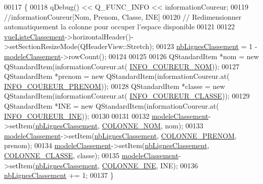 \begin{DoxyCode}
00117 \{
00118     qDebug() << Q\_FUNC\_INFO << informationCoureur;
00119     \textcolor{comment}{//informationCoureur[Nom, Prenom, Classe, INE]}
00120     \textcolor{comment}{// Redimensionner automatiquement la colonne pour occuper l'espace disponible}
00121 
00122     \hyperlink{class_i_h_m_resultats_cross_a8f35fc63f8c3a1351658d3148daf13e0}{vueListeClassement}->horizontalHeader()->setSectionResizeMode(QHeaderView::Stretch);
00123     \hyperlink{class_i_h_m_resultats_cross_a696f826387c8fa8b9925ca468a52482e}{nbLignesClassement} = 1 - \hyperlink{class_i_h_m_resultats_cross_a9d4e02948f64b6d9fef422d7f5a2b9b5}{modeleClassement}->rowCount();
00124 
00125 
00126     QStandardItem *nom = \textcolor{keyword}{new} QStandardItem(informationCoureur.at(
      \hyperlink{ihmchronocross_8h_a71b99ea06ae916bcd158edbd441c8c24}{INFO\_COUREUR\_NOM}));
00127     QStandardItem *prenom = \textcolor{keyword}{new} QStandardItem(informationCoureur.at(
      \hyperlink{ihmchronocross_8h_a68fd2611ad0ef66da1a71726675067e7}{INFO\_COUREUR\_PRENOM}));
00128     QStandardItem *classe = \textcolor{keyword}{new} QStandardItem(informationCoureur.at(
      \hyperlink{ihmchronocross_8h_a104dfa4cfc656a690caaec36fd4d3e2d}{INFO\_COUREUR\_CLASSE}));
00129     QStandardItem *INE = \textcolor{keyword}{new} QStandardItem(informationCoureur.at(
      \hyperlink{ihmgestioncross_8h_a2e5435ad2b0c61674b2dad6c0ea46301}{INFO\_COUREUR\_INE}));
00130 
00131 
00132     \hyperlink{class_i_h_m_resultats_cross_a9d4e02948f64b6d9fef422d7f5a2b9b5}{modeleClassement}->setItem(\hyperlink{class_i_h_m_resultats_cross_a696f826387c8fa8b9925ca468a52482e}{nbLignesClassement}, 
      \hyperlink{ihmchronocross_8h_aeee76385895c145ef5a633e6c6812603}{COLONNE\_NOM}, nom);
00133     \hyperlink{class_i_h_m_resultats_cross_a9d4e02948f64b6d9fef422d7f5a2b9b5}{modeleClassement}->setItem(\hyperlink{class_i_h_m_resultats_cross_a696f826387c8fa8b9925ca468a52482e}{nbLignesClassement}, 
      \hyperlink{ihmchronocross_8h_a5d6f240d26209cd66db8aa5e1aac62f9}{COLONNE\_PRENOM}, prenom);
00134     \hyperlink{class_i_h_m_resultats_cross_a9d4e02948f64b6d9fef422d7f5a2b9b5}{modeleClassement}->setItem(\hyperlink{class_i_h_m_resultats_cross_a696f826387c8fa8b9925ca468a52482e}{nbLignesClassement}, 
      \hyperlink{ihmchronocross_8h_a114680edc01528f77bb689b0a2ca18a2}{COLONNE\_CLASSE}, classe);
00135     \hyperlink{class_i_h_m_resultats_cross_a9d4e02948f64b6d9fef422d7f5a2b9b5}{modeleClassement}->setItem(\hyperlink{class_i_h_m_resultats_cross_a696f826387c8fa8b9925ca468a52482e}{nbLignesClassement}, 
      \hyperlink{ihmgestioncross_8h_aa8208c9f9fd2ea2418e4b7bb28175f80}{COLONNE\_INE}, INE);
00136     \hyperlink{class_i_h_m_resultats_cross_a696f826387c8fa8b9925ca468a52482e}{nbLignesClassement} += 1;
00137 \}
\end{DoxyCode}
\mbox{\label{class_i_h_m_resultats_cross_a5e8e7f363a93e1e5e6b3c5eb0ad29c28}} 
